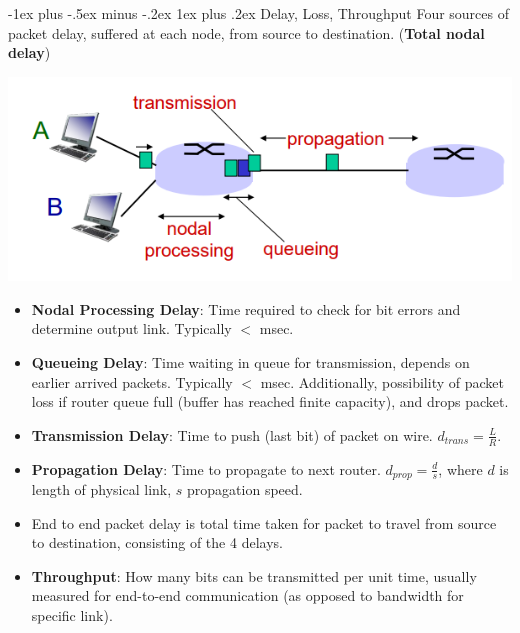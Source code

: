 \documentclass[12pt, landscape]{article}
\makeatletter
\renewcommand{\subsubsection}{\@startsection{subsubsection}{3}{0.1mm}%
                                {-1ex plus -.5ex minus -.2ex}%
                                {1ex plus .2ex}%
                                {\normalfont\small\bfseries}}
\makeatother
\begin{document}
\begin{multicols*}{3}
\subsubsection{Delay, Loss, Throughput}
Four sources of packet delay, suffered at each node, from source to destination. (\textbf{Total nodal delay})
\centerline{\includegraphics[width=0.6\linewidth]{totalnodaldelay}}
\begin{itemize}
\item \textbf{Nodal Processing Delay}: Time required to check for bit errors and determine output link. Typically $<$ msec.
\item \textbf{Queueing Delay}: Time waiting in queue for transmission, depends on earlier arrived packets. Typically $<$ msec. Additionally, possibility of
						packet loss if router queue full (buffer has reached finite capacity), and drops packet.
\item \textbf{Transmission Delay}: Time to push (last bit) of packet on wire. $d_{trans} = \frac{L}{R}$.
\item \textbf{Propagation Delay}: Time to propagate to next router. $d_{prop} = \frac{d}{s}$, where $d$ is length of physical link, $s$ propagation speed.
\item End to end packet delay is total time taken for packet to travel from source to destination, consisting of the 4 delays.
\item \textbf{Throughput}: How many bits can be transmitted per unit time, usually measured for end-to-end communication (as opposed to bandwidth for specific link).
\end{itemize}


\end{multicols*}
\end{document}

